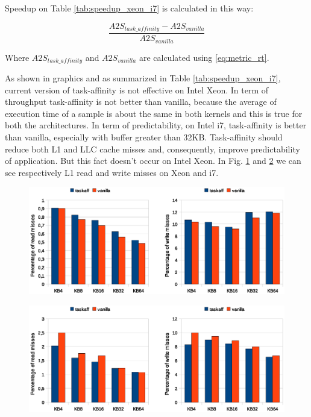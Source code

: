 Speedup on Table \ref{tab:speedup_xeon_i7} is calculated in this way:

\begin{equation}
        \frac{A2S_{task\_affinity} - A2S_{vanilla}}{A2S_{vanilla}}
\label{eq:miss_rate}
\end{equation}

Where $A2S_{task\_affinity}$ and $A2S_{vanilla}$ are calculated using \ref{eq:metric_rt}.

As shown in graphics and as summarized in Table \ref{tab:speedup_xeon_i7}, current version of task-affinity is not effective on Intel Xeon.
In term of throughput task-affinity is not better than vanilla, because the average of execution time of a sample is about the same in both kernels and this
is true for both the architectures. In term of predictability, on Intel i7, task-affinity is better than vanilla, especially with buffer greater than 32KB.
Task-affinity should reduce both L1 and LLC cache misses and, consequently, improve predictability of application. But this fact doesn't occur on Intel 
Xeon. In Fig. \ref{fig:l1_load_store_Xeon} and \ref{fig:l1_load_store_i7} we can see respectively L1 read and write misses on Xeon and i7.

\begin{figure}[htbp]
 \centering
  \includegraphics[width=\widefigure]{images/cache_miss/l1_load_store_Xeon.eps}
  \label{fig:l1_load_store_Xeon}
 \caption{}
\end{figure}

\begin{figure}[htbp]
 \centering
  \includegraphics[width=\widefigure]{images/cache_miss/l1_load_store_i7.eps}
  \label{fig:l1_load_store_i7}
 \caption{}
\end{figure}


